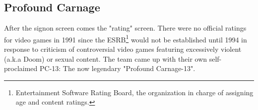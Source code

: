 \documentclass[book.tex]{subfiles}
\begin{document}
\subsection{Profound Carnage}
After the signon screen comes the "rating" screen. There were no official ratings for video games in 1991 since the ESRB\footnote{Entertainment Software Rating Board, the organization in charge of assigning age and content ratings.} would not be established until 1994 in response to criticism of controversial video games featuring excessively violent (a.k.a Doom) or sexual content. The team came up with their own self-proclaimed PC-13: The now legendary "Profound Carnage-13".\\
\begin{figure}[H]
\centering
{}
\end{figure}
\end{document}
